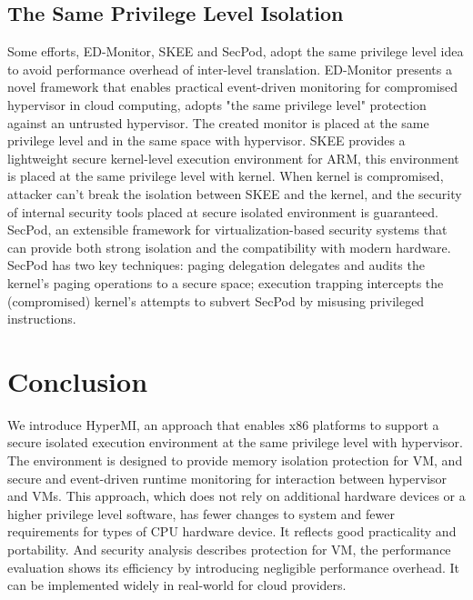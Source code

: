 \documentclass[conference]{IEEEtran}
\begin{document}
\subsection{The Same Privilege Level Isolation}
Some efforts, ED-Monitor\cite{Deng2017Dancing}, SKEE\cite{Azab2016SKEE} and SecPod\cite{Wang2015SecPod}, adopt the same privilege level idea to avoid performance overhead of inter-level translation. ED-Monitor presents a novel framework that enables practical event-driven monitoring for compromised hypervisor in cloud computing, adopts "the same privilege level" protection against an untrusted hypervisor. The created monitor is placed at the same privilege level and in the same space with hypervisor. SKEE provides a lightweight secure kernel-level execution environment for ARM, this environment is placed at the same privilege level with kernel. When kernel is compromised, attacker can't break the isolation between SKEE and the kernel, and the security of internal security tools placed at secure isolated environment is guaranteed. SecPod, an extensible framework for virtualization-based security systems that can provide both strong isolation and the compatibility with modern hardware. SecPod has two key techniques: paging delegation delegates and audits the kernel's paging operations to a secure space; execution trapping intercepts the (compromised) kernel's attempts to subvert SecPod by misusing privileged instructions.

\section{Conclusion}
We introduce HyperMI, an approach that enables x86 platforms to support a secure isolated execution environment at the same privilege level with hypervisor. The environment is designed to provide memory isolation protection for VM, and secure and event-driven runtime monitoring for interaction between hypervisor and VMs. This approach, which does not rely on additional hardware devices or a higher privilege level software, has fewer changes to system and fewer requirements for types of CPU hardware device. It reflects good practicality and portability. And security analysis describes protection for VM, the performance evaluation shows its efficiency by introducing negligible performance overhead. It can be implemented widely in real-world for cloud providers.


 

\end{document}
